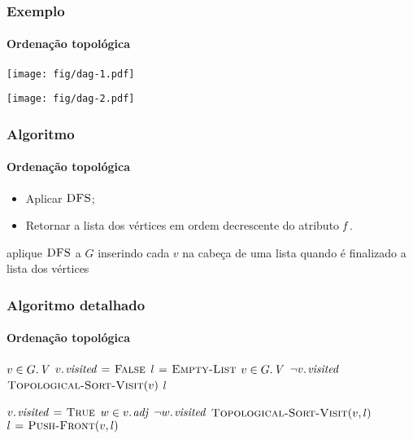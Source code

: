 \documentclass{beamer}
\begin{document}
\begin{frame}
\frametitle{Exemplo}
\framesubtitle{Ordenação topológica}
\begin{center}
\texttt{[image: fig/dag-1.pdf]}
\end{center}

\begin{center}
\texttt{[image: fig/dag-2.pdf]}
\end{center}

\end{frame}

\begin{frame}
\frametitle{Algoritmo}
\framesubtitle{Ordenação topológica}

\begin{itemize}
\item Aplicar $\textnormal{\scshape DFS}$;
\item Retornar a lista dos vértices em ordem decrescente do atributo $\id{f}$.
\end{itemize}

\begin{codebox}
\zi aplique $\textnormal{\scshape DFS}$ a $G$
\zi inserindo cada $v$ na cabeça de uma lista quando é finalizado
\zi \Return a lista dos vértices
\end{codebox}

\end{frame}

\begin{frame}
\frametitle{Algoritmo detalhado}
\framesubtitle{Ordenação topológica}

\begin{codebox}
\zi \For $v \in \attrib{G}{V}$
\zi \Do $\attrib{v}{visited} \gets \const{False}$
    \End
\zi $l \mathrel{\hspace{1pt}=\hspace{1pt}} \textnormal{\scshape Empty-List}$
\zi \For $v \in \attrib{G}{V}$
\zi \Do \If $\neg \attrib{v}{visited}$
\zi   \Then $\textnormal{\scshape Topological-Sort-Visit}(v)$
      \End
    \End
\zi \Return $l$
\end{codebox}

\begin{codebox}
\zi $\attrib{v}{visited} \gets \const{True}$
\zi \For $w \in \attrib{v}{adj}$
\zi \Do \If $\neg \attrib{w}{visited}$
\zi   \Then $\textnormal{\scshape Topological-Sort-Visit}(v, l)$
      \End
    \End
\zi $l \mathrel{\hspace{1pt}=\hspace{1pt}} \textnormal{\scshape Push-Front}(v, l)$
\end{codebox}

\end{frame}
\end{document}
